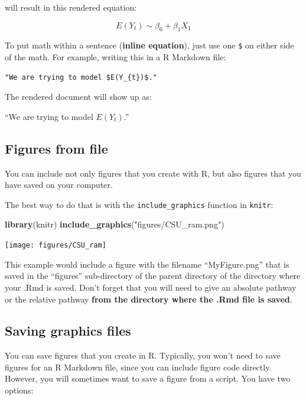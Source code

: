\documentclass[]{book}
\makeatletter
\newenvironment{Shaded}{\begin{snugshade}}{\end{snugshade}}
\newcommand{\KeywordTok}[1]{\textcolor[rgb]{0.13,0.29,0.53}{\textbf{#1}}}
\newcommand{\StringTok}[1]{\textcolor[rgb]{0.31,0.60,0.02}{#1}}
\newcommand{\NormalTok}[1]{#1}
\newenvironment{kframe}{%
\medskip{}
\setlength{\fboxsep}{.8em}
 \def\at@end@of@kframe{}%
 \ifinner\ifhmode%
  \def\at@end@of@kframe{\end{minipage}}%
  \begin{minipage}{\columnwidth}%
 \fi\fi%
 \def\FrameCommand##1{\hskip\@totalleftmargin \hskip-\fboxsep
 \colorbox{shadecolor}{##1}\hskip-\fboxsep
     \hskip-\linewidth \hskip-\@totalleftmargin \hskip\columnwidth}%
 \MakeFramed {\advance\hsize-\width
   \@totalleftmargin\z@ \linewidth\hsize
   \@setminipage}}%
 {\par\unskip\endMakeFramed%
 \at@end@of@kframe}
\renewenvironment{Shaded}{\begin{kframe}}{\end{kframe}}
\theoremstyle{definition}
\theoremstyle{definition}
\theoremstyle{definition}
\theoremstyle{remark}
\makeatother
\begin{document}
will result in this rendered equation:

\[
E(Y_{t}) \sim \beta_{0} + \beta_{1}X_{1}
\]

To put math within a sentence (\textbf{inline equation}), just use one
\texttt{\$} on either side of the math. For example, writing this in a R
Markdown file:

\begin{verbatim}
"We are trying to model $E(Y_{t})$."
\end{verbatim}

The rendered document will show up as: \medskip

``We are trying to model \(E(Y_{t})\).''

\subsection{Figures from file}\label{figures-from-file}

You can include not only figures that you create with R, but also
figures that you have saved on your computer.

The best way to do that is with the \texttt{include\_graphics} function
in \texttt{knitr}:

\begin{Shaded}
\begin{Highlighting}[]
\KeywordTok{library}\NormalTok{(knitr)}
\KeywordTok{include_graphics}\NormalTok{(}\StringTok{"figures/CSU_ram.png"}\NormalTok{)}
\end{Highlighting}
\end{Shaded}

\begin{center}\texttt{[image: figures/CSU\_ram]} \end{center}

This example would include a figure with the filename ``MyFigure.png''
that is saved in the ``figures'' sub-directory of the parent directory
of the directory where your .Rmd is saved. Don't forget that you will
need to give an absolute pathway or the relative pathway \textbf{from
the directory where the .Rmd file is saved}.

\subsection{Saving graphics files}\label{saving-graphics-files}

You can save figures that you create in R. Typically, you won't need to
save figures for an R Markdown file, since you can include figure code
directly. However, you will sometimes want to save a figure from a
script. You have two options:
\end{document}
